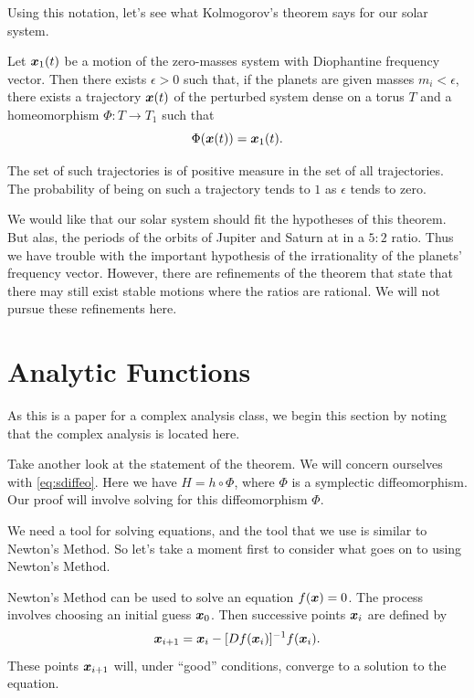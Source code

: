 \documentclass[twoside,letterpaper,10pt]{article}
\numberwithin{equation}{section}
\begin{document}
Using this notation, let's see what Kolmogorov's theorem says for our solar
system.
\begin{thm}
  Let $\bm{x}_1(t)$ be a motion of the zero-masses system with Diophantine
  frequency vector.
  Then there exists $\epsilon > 0$ such that, if the planets are given masses
  $m_i < \epsilon$, there exists a trajectory $\bm{x}(t)$ of the perturbed
  system dense on a torus $T$ and a homeomorphism $\Phi : T \to T_1$ such that
  \begin{equation*}
    \Phi(\bm{x}(t)) = \bm{x}_1(t).
  \end{equation*}

  The set of such trajectories is of positive measure in the set of all
  trajectories.
  The probability of being on such a trajectory tends to $1$ as $\epsilon$ tends
  to zero.
\end{thm}

We would like that our solar system should fit the hypotheses of this theorem.
But alas, the periods of the orbits of Jupiter and Saturn at in a $5 : 2$ ratio.
Thus we have trouble with the important hypothesis of the irrationality of the
planets' frequency vector.
However, there are refinements of the theorem that state that there may still
exist stable motions where the ratios are rational.
We will not pursue these refinements here.

\section{Analytic Functions}
\label{sec:analytic-functions}

As this is a paper for a complex analysis class, we begin this section by noting
that the complex analysis is located here.

Take another look at the statement of the theorem.
We will concern ourselves with \cref{eq:sdiffeo}.
Here we have $H = h \circ \Phi$, where $\Phi$ is a symplectic diffeomorphism.
Our proof will involve solving for this diffeomorphism $\Phi$.

We need a tool for solving equations, and the tool that we use is similar to
Newton's Method.
So let's take a moment first to consider what goes on to using Newton's Method.

Newton's Method can be used to solve an equation $f(\bm{x}) = 0$.
The process involves choosing an initial guess $\bm{x}_0$.
Then successive points $\bm{x}_i$ are defined by
\begin{equation*}
  \bm{x}_{i+1} = \bm{x}_i - [Df(\bm{x}_i)]^{-1} f(\bm{x}_i).
\end{equation*}
These points $\bm{x}_{i+1}$ will, under ``good'' conditions, converge to a
solution to the equation.
\end{document}
